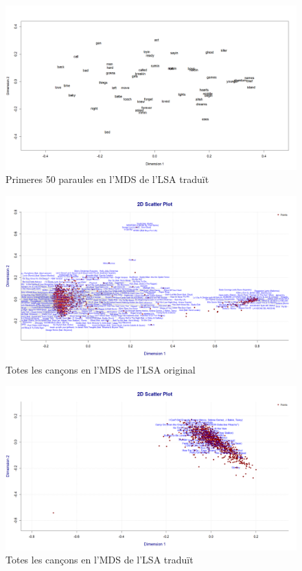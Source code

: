 \begin{figure}[H]
\centering
    \includegraphics[width=0.8\linewidth]{Images//8_Textual//LSA/first_50_words.png}
    \caption{Primeres 50 paraules en l'MDS de l'LSA traduït}
    \label{fig:textual_lsa_trans_50w}
\end{figure}

\begin{figure}[H]
\centering
    \includegraphics[width=0.8\linewidth]{Images//8_Textual//LSA/orignal_all_songs_MDS.png}
    \caption{Totes les cançons en l'MDS de l'LSA original}
    \label{fig:textual_lsa_original_allsongsMDS}
\end{figure}

\begin{figure}[H]
\centering
    \includegraphics[width=0.8\linewidth]{Images//8_Textual//LSA/all_songs_less_labels_MDS.png}
    \caption{Totes les cançons en l'MDS de l'LSA traduït}
    \label{fig:textual_lsa_trans_allsongsMDS}
\end{figure}

